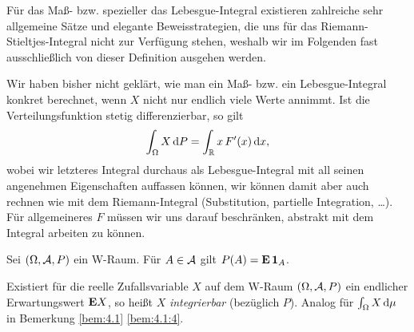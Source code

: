 Für das Maß- bzw. spezieller das Lebesgue-Integral existieren zahlreiche sehr
allgemeine Sätze und elegante Beweisstrategien, die uns für das
Riemann-Stieltjes-Integral nicht zur Verfügung stehen, weshalb wir im Folgenden
fast ausschließlich von dieser Definition ausgehen werden.

Wir haben bisher nicht geklärt, wie man ein Maß- bzw. ein  Lebesgue-Integral
konkret berechnet, wenn $X$ nicht nur endlich viele Werte annimmt. Ist die
Verteilungsfunktion stetig differenzierbar, so gilt
\begin{align*}
\int_\Omega X\dP = \int_\R x\, F'(x)\dx,
\end{align*}
wobei wir letzteres Integral durchaus als
Lebesgue-Integral mit all seinen angenehmen Eigenschaften auffassen können,
wir können damit aber auch rechnen wie mit dem Riemann-Integral (Substitution,
partielle Integration, \ldots). Für allgemeineres $F$ müssen wir uns darauf
beschränken, abstrakt mit dem Integral arbeiten zu können. 

\begin{bem}
\label{bem:4.2}
Sei $(\Omega, \AA, P)$ ein W-Raum. Für $A \in \AA$ gilt
$P (A) = \E\,\Id _{A}$.\maphere
\end{bem}

\begin{defn}
\label{defn:4.3}
Existiert für die reelle Zufallsvariable $X$ auf dem W-Raum
$(\Omega, \AA,P)$ ein endlicher Erwartungswert $\E X$, so heißt $X$
\emph{integrierbar} (bezüglich $P$). Analog für $\int_{\Omega } X\dmu $ in
Bemerkung \ref{bem:4.1} \ref{bem:4.1:4}.\fishhere
\end{defn}

